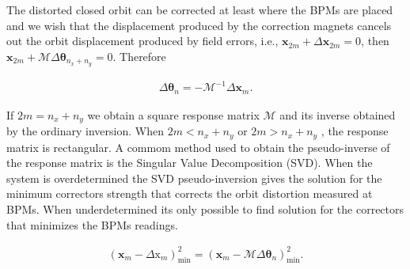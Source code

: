 The distorted closed orbit can be corrected at least where the BPMs are placed and we wish that the displacement produced by the correction magnets cancels out the orbit displacement produced by field errors, i.e., $\mathbf{x}_{2m} + \Delta \mathbf{x}_{2m} = 0$, then $\mathbf{x}_{2m} + \mathcal{M}\Delta\boldsymbol{\theta}_{n_x + n_y} = 0$. Therefore

\begin{align*}
  \Delta \boldsymbol{\theta}_n = - \mathcal{M}^{-1}\Delta \mathbf{x}_m.
\end{align*}

If $2m=n_x+n_y$ we obtain a square response matrix $\mathcal{M}$ and its inverse obtained by the ordinary inversion. When $2m < n_x+n_y$ or $2m > n_x + n_y$ , the response matrix is rectangular. A commom method used to obtain the pseudo-inverse of the response matrix is the Singular Value Decomposition (SVD). When the system is overdetermined the SVD pseudo-inversion gives the solution for the minimum correctors strength that corrects the orbit distortion measured at BPMs. When underdetermined its only possible to find solution for the correctors that minimizes the BPMs readings.

\begin{align*}
  \left(\mathbf{x}_m - \Delta \mathrm{x}_m\right)^{2}_{\text{min}}=  \left(\mathbf{x}_m - \mathcal{M}\Delta \boldsymbol{\theta}_n\right)^{2}_{\text{min}}.
\end{align*}
